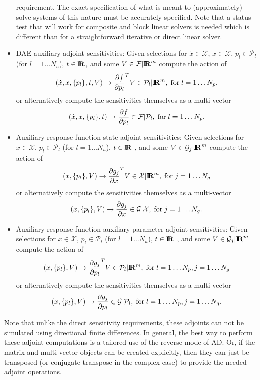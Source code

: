 \documentclass[pdf,ps2pdf,11pt]{SANDreport}
\begin{document}
\begin{itemize}
requirement.  The exact specification of what is meant to (approximately)
solve systems of this nature must be accurately specified. Note that a status
test that will work for composite and block linear solvers is needed which is
different than for a straightforward iterative or direct linear solver.
%
{}\item DAE auxiliary adjoint sensitivities: Given selections for
$\dot{x}\in\mathcal{X}$, $x\in\mathcal{X}$, $p_l\in\mathcal{P}_l$ (for
$l=1\ldots{}N_u$), $t\in\mbox{\textbf{I}}\hspace{-0.6ex}\mbox{\textbf{R}}$, and some $V\in\mathcal{F}|\mbox{\textbf{I}}\hspace{-0.6ex}\mbox{\textbf{R}}^m$ compute
the action of
\[
(\dot{x},x,\{p_l\},t,V) {}\rightarrow \displaystyle{\frac{\partial f}{\partial p_l}}^T V \in \mathcal{P}_l|\mbox{\textbf{I}}\hspace{-0.6ex}\mbox{\textbf{R}}^m,
\; \mbox{for} \; l = 1 {}\ldots N_p,
\]
or alternatively compute the sensitivities themselves as a multi-vector
\[
(\dot{x},x,\{p_l\},t) {}\rightarrow \displaystyle{\frac{\partial f}{\partial p_l}} \in \mathcal{F}|\mathcal{P}_l,
\; \mbox{for} \; l = 1 {}\ldots N_p.
\]

{}\item Auxiliary response function state adjoint sensitivities: Given selections for
$x\in\mathcal{X}$, $p_l\in\mathcal{P}_l$ (for $l=1\ldots{}N_u$), $t\in\mbox{\textbf{I}}\hspace{-0.6ex}\mbox{\textbf{R}}$ ,
and some $V\in\mathcal{G}_j|\mbox{\textbf{I}}\hspace{-0.6ex}\mbox{\textbf{R}}^m$ compute the action of
\[
(x,\{p_l\},V) {}\rightarrow \displaystyle{\frac{\partial g_j}{\partial x}}^T V \in \mathcal{X}|\mbox{\textbf{I}}\hspace{-0.6ex}\mbox{\textbf{R}}^m,
\; \mbox{for} \; j = 1 \ldots N_g
\]
or alternatively compute the sensitivities themselves as a multi-vector
\[
(x,\{p_l\},V) {}\rightarrow \displaystyle{\frac{\partial g_j}{\partial x}} \in \mathcal{G}|\mathcal{X},
\; \mbox{for} \; j = 1 \ldots N_g.
\]

{}\item Auxiliary response function auxiliary parameter adjoint
sensitivities: Given selections for $x\in\mathcal{X}$,
$p_l\in\mathcal{P}_l$ (for $l=1\ldots{}N_u$), $t\in\mbox{\textbf{I}}\hspace{-0.6ex}\mbox{\textbf{R}}$ , and some
$V\in\mathcal{G}_j|\mbox{\textbf{I}}\hspace{-0.6ex}\mbox{\textbf{R}}^m$ compute the action of
\[
(x,\{p_l\},V) {}\rightarrow \displaystyle{\frac{\partial g_j}{\partial p_l}}^T V \in \mathcal{P}_l|\mbox{\textbf{I}}\hspace{-0.6ex}\mbox{\textbf{R}}^m,
\; \mbox{for} \; l = 1 {}\ldots N_p, j = 1 \ldots N_g
\]
or alternatively compute the sensitivities themselves as a multi-vector
\[
(x,\{p_l\},V) {}\rightarrow \displaystyle{\frac{\partial g_j}{\partial p_l}} \in \mathcal{G}|\mathcal{P}_l,
\; \mbox{for} \; l = 1 {}\ldots N_p, j = 1 \ldots N_g.
\]

\end{itemize}

Note that unlike the direct sensitivity requirements, these adjoints can not
be simulated using directional finite differences.  In general, the best way
to perform these adjoint computations is a tailored use of the reverse mode of
AD.  Or, if the matrix and multi-vector objects can be created explicitly,
then they can just be transposed (or conjugate transpose in the complex case)
to provide the needed adjoint operations.
\end{document}
